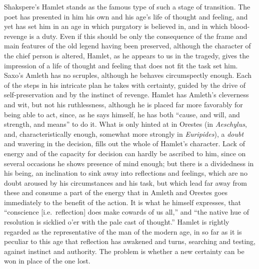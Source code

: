 \documentclass[12pt,a4paper]{book}
\newcommand{\opage}[1]{\marginnote{\footnotesize\textit{[#1]}}}
\begin{document}
Shakspere's Hamlet stands as the famous type of such a stage of
transition. The poet has presented in him his own and his age's life of
thought and feeling, and yet has set him in an age in which purgatory is
believed in, and in which blood-revenge is a duty.
\opage{393}Even if this should be only the consequence of the frame and
main features of the old legend having been preserved, although the
character of the chief person is altered, Hamlet, as he appears to us in
the tragedy, gives the impression of a life of thought and feeling that
does not fit the task set him. Saxo's Amleth has no scruples, although he
behaves circumspectly enough. Each of the steps in his intricate plan he
takes with certainty, guided by the drive of self-preservation and by the
instinct of revenge. Hamlet has Amleth's cleverness and wit, but not his
ruthlessness, although he is placed far more favorably for being able to
act, since, as he says himself, he has both ``cause, and will, and
strength, and means'' to do it. What is only hinted at in Orestes (in
\emph{Aeschylus}, and, characteristically enough, somewhat more strongly
in \emph{Euripides}), a \emph{doubt} and wavering in the decision, fills
out the whole of Hamlet's character. Lack of energy and of the capacity
for decision can hardly be ascribed to him, since on several occasions he
shows presence of mind enough; but there is a dividedness in his being,
an inclination to sink away into reflections and feelings, which are no
doubt aroused by his circumstances and his task, but which lead far away
from these and consume a part of the energy that in Amleth and Orestes
goes immediately to the benefit of the action. It is what he himself
expresses, that ``conscience [i.e.\ reflection] does make cowards of us
all,'' and ``the native hue of resolution is sicklied o'er with the pale
cast of thought.'' Hamlet is rightly regarded as the representative of
the man of the modern age, in so far as it is peculiar to this age that
reflection has awakened and turns, searching and testing, against instinct
and authority. The problem is whether a new certainty can be won in place
of the one lost.
\end{document}
